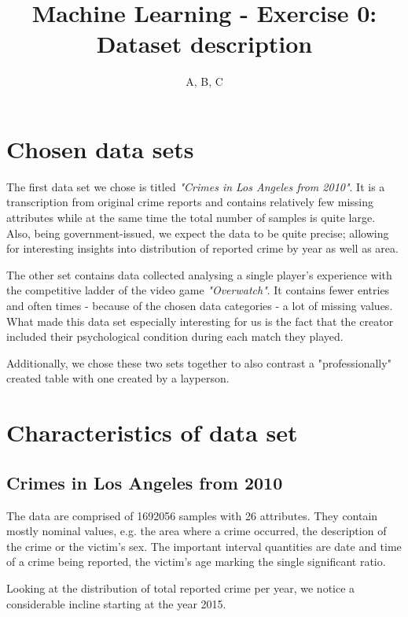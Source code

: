 \documentclass{article}
\begin{document}
\title{Machine Learning - Exercise 0: Dataset description}
\author{A, B, C}
\date{}
\maketitle
\section*{Chosen data sets}
The first data set we chose is titled \textit{"Crimes in Los Angeles from 2010"}.
It is a transcription from original crime reports and contains relatively few missing attributes while at the same time the total number of samples is quite large.
Also, being government-issued, we expect the data to be quite precise; allowing for interesting insights into distribution of reported crime by year as well as area.

The other set contains data collected analysing a single player's experience with the competitive ladder of the video game \textit{"Overwatch"}.
It contains fewer entries and often times - because of the chosen data categories - a lot of missing values.
What made this data set especially interesting for us is the fact that the creator included their psychological condition during each match they played.

Additionally, we chose these two sets together to also contrast a "professionally" created table with one created by a layperson.

\section*{Characteristics of data set}
\subsection*{Crimes in Los Angeles from 2010}
The data are comprised of 1692056 samples with 26 attributes.
They contain mostly nominal values, e.g. the area where a crime occurred, the description of the crime or the victim's sex.
The important interval quantities are date and time of a crime being reported, the victim's age marking the single significant ratio.

Looking at the distribution of total reported crime per year, we notice a considerable incline starting at the year 2015.

\end{document}
